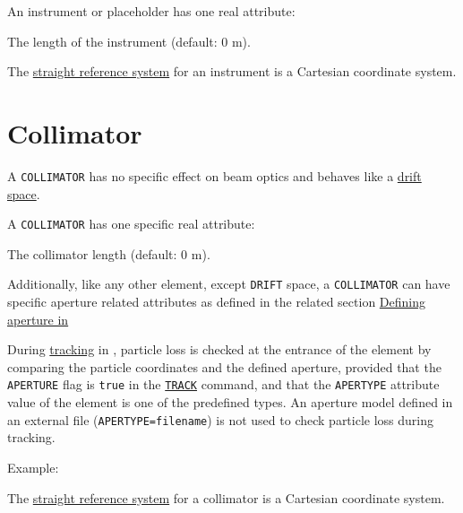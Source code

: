 
An instrument or placeholder has one real attribute:
\begin{madlist}
    The length of the instrument (default: 0 m).
\end{madlist}

The \hyperref[subsec:local-straight]{straight reference system} for an
instrument is a Cartesian coordinate system.


\section{Collimator}
\label{sec:collimator}

A \texttt{COLLIMATOR} has no specific effect on beam optics and behaves like a
\hyperref[sec:drift]{drift space}.


A \texttt{COLLIMATOR} has one specific real attribute:
\begin{madlist}
   The collimator length (default: 0 m).
\end{madlist}

Additionally, like any other element, except \texttt{DRIFT} space,
a \texttt{COLLIMATOR} can have specific aperture related attributes
as defined in the related section \hyperref[sec:def-aper]{Defining
aperture in \madx}

During \hyperref[chap:thintrack]{tracking} in \madx, particle loss
is checked at the entrance of the element by comparing the particle coordinates
and the defined aperture, provided that the \texttt{APERTURE} flag is \texttt{true}
in the \hyperref[sec:track]{\texttt{TRACK}} command,
and that the \texttt{APERTYPE} attribute value of the element is one of the
predefined types.
An aperture model defined in an external file (\texttt{APERTYPE=filename})
is not used to check particle loss during tracking.

Example:

The \hyperref[subsec:local-straight]{straight reference system} for a
collimator is a Cartesian coordinate system.

